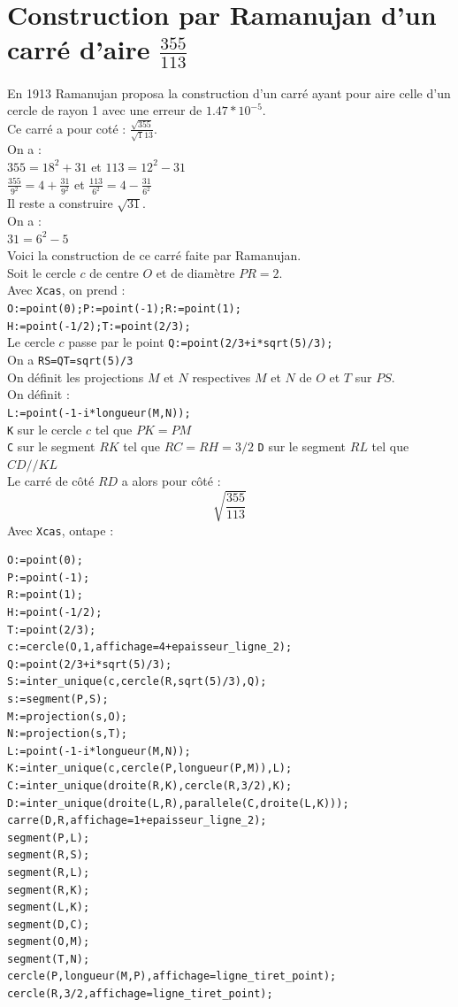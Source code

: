 \documentclass[a4paper,11pt]{book}
\begin{document}
\section{Construction par Ramanujan d'un carr\'e d'aire $\frac{355}{113}$}
En 1913 Ramanujan proposa la construction d'un carr\'e ayant pour aire celle
d'un cercle de rayon 1 avec une erreur de $1.47*10^{-5}$.\\
Ce carr\'e a pour cot\'e : $\frac{\sqrt{355}}{\sqrt 113}$.\\
On a :\\
$355=18^2+31$ et $113=12^2-31$\\
$\frac{355}{9^2}=4+\frac{31}{9^2}$ et $\frac{113}{6^2}=4-\frac{31}{6^2}$\\
Il reste a construire $\sqrt{31}$.\\
On a :\\
$31=6^2-5$\\
Voici la construction de ce carr\'e faite par Ramanujan.\\
Soit le cercle $c$ de centre $O$ et de diam\`etre $PR=2$.\\
Avec {\tt Xcas}, on prend :\\
{\tt O:=point(0);P:=point(-1);R:=point(1);}\\
{\tt H:=point(-1/2);T:=point(2/3);}\\
Le cercle $c$ passe par le point {\tt Q:=point(2/3+i*sqrt(5)/3);}\\
On a {\tt RS=QT=sqrt(5)/3}\\
On d\'efinit les projections $M$ et $N$ respectives  $M$ et $N$ de $O$ et $T$
sur $PS$.\\
On d\'efinit :\\
{\tt L:=point(-1-i*longueur(M,N));}\\
{\tt K} sur le cercle $c$ tel que $PK=PM$\\
{\tt C} sur le segment $RK$ tel que $RC=RH=3/2$
{\tt D} sur le segment $RL$ tel que $CD//KL$\\
Le carr\'e de c\^ot\'e $RD$ a alors pour c\^ot\'e :\\
$$\sqrt{\frac{355}{113}}$$
Avec {\tt Xcas}, ontape :
\begin{verbatim}
O:=point(0);
P:=point(-1);
R:=point(1);
H:=point(-1/2);
T:=point(2/3);
c:=cercle(O,1,affichage=4+epaisseur_ligne_2);
Q:=point(2/3+i*sqrt(5)/3);
S:=inter_unique(c,cercle(R,sqrt(5)/3),Q);
s:=segment(P,S);
M:=projection(s,O);
N:=projection(s,T);
L:=point(-1-i*longueur(M,N));
K:=inter_unique(c,cercle(P,longueur(P,M)),L);
C:=inter_unique(droite(R,K),cercle(R,3/2),K);
D:=inter_unique(droite(L,R),parallele(C,droite(L,K)));
carre(D,R,affichage=1+epaisseur_ligne_2);
segment(P,L);
segment(R,S);
segment(R,L);
segment(R,K);
segment(L,K);
segment(D,C);
segment(O,M);
segment(T,N);
cercle(P,longueur(M,P),affichage=ligne_tiret_point);
cercle(R,3/2,affichage=ligne_tiret_point);
\end{verbatim}
\end{document}

